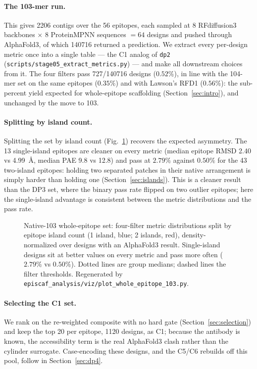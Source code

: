 \paragraph{The 103-mer run.} This gives \num{2206} contigs over the \num{56} epitopes, each sampled at \num{8}
RFdiffusion3 backbones $\times$ \num{8} ProteinMPNN sequences $=\num{64}$ designs and pushed through
AlphaFold3, of which \num{140716} returned a prediction. We extract every per-design metric once into a
single table --- the C1 analog of \texttt{dp2} (\texttt{scripts/stage05\_extract\_metrics.py}) --- and
make all downstream choices from it. The four filters pass \num{727}/\num{140716} designs ($0.52\%$),
in line with the \num{104}-mer set on the same epitopes ($0.35\%$) and with Lawson's RFD1 ($0.56\%$):
the sub-percent yield expected for whole-epitope scaffolding (Section~\ref{sec:intro}), and unchanged by
the move to \num{103}.

\paragraph{Splitting by island count.} Splitting the set by island count (Fig.~\ref{fig:c1island}) recovers the
expected asymmetry. The \num{13} single-island epitopes are cleaner on every metric (median epitope RMSD
\num{2.40} vs \num{4.99}~\si{\angstrom}, median PAE \num{9.8} vs \num{12.8}) and pass at $2.79\%$ against
$0.50\%$ for the \num{43} two-island epitopes: holding two separated patches in their native arrangement
is simply harder than holding one (Section~\ref{sec:islands}). This is a cleaner result than the DP3
set, where the binary pass rate flipped on two outlier epitopes; here the single-island advantage is
consistent between the metric distributions and the pass rate.

\begin{figure}[h]\centering
{}
\caption{Native-103 whole-epitope set: four-filter metric distributions split by epitope island count
(1 island, blue; 2 islands, red), density-normalized over designs with an AlphaFold3 result.
Single-island designs sit at better values on every metric and pass more often ($2.79\%$ vs $0.50\%$).
Dotted lines are group medians; dashed lines the filter thresholds. Regenerated by
\texttt{episcaf\_analysis/viz/plot\_whole\_epitope\_103.py}.}
\label{fig:c1island}
\end{figure}

\paragraph{Selecting the C1 set.} We rank on the re-weighted composite with no hard gate
(Section~\ref{sec:selection}) and keep the top \num{20} per epitope, \num{1120} designs, as C1; because
the antibody is known, the accessibility term is the real AlphaFold3 clash rather than the cylinder
surrogate. Case-encoding these designs, and the C5/C6 rebuilds off this pool, follow in
Section~\ref{sec:dp4}.
